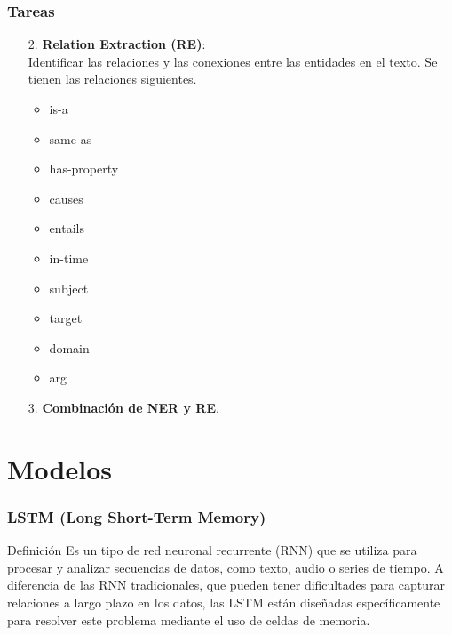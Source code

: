 \documentclass[
11pt, %
%
aspectratio=169, %
]{beamer}
\begin{document}
 	  \begin{frame}
 		\frametitle{Tareas}
 		
 		\begin{enumerate}			
  			\item[2.] \textbf{Relation Extraction (RE)}:\\
  			
  			 Identificar las relaciones y las conexiones entre las entidades en el texto. Se tienen las relaciones siguientes.
  			 \begin{itemize}
  			 	\item is-a
  			 	\item same-as
  			 	\item has-property
  			 	\item causes
  			 	\item entails
  			 	\item in-time
  			 	\item subject
  			 	\item target
  			 	\item domain
  			 	\item arg
  			 	
  			 \end{itemize}
  			 
 			\item[3.] \textbf{Combinación de NER y RE}.
 		\end{enumerate}
 		
 		
 	\end{frame}
	
	\section{Modelos}
	
	\begin{frame}
		\frametitle{LSTM (Long Short-Term Memory)}
		\begin{block}{Definici\'on}
			Es un tipo de red neuronal recurrente (RNN) que se utiliza para procesar y analizar secuencias de datos, como texto, audio o series de tiempo. A diferencia de las RNN tradicionales, que pueden tener dificultades para capturar relaciones a largo plazo en los datos, las LSTM están diseñadas específicamente para resolver este problema mediante el uso de celdas de memoria.
		\end{block}
	
		
		
		
	\end{frame}
	
\end{document}
